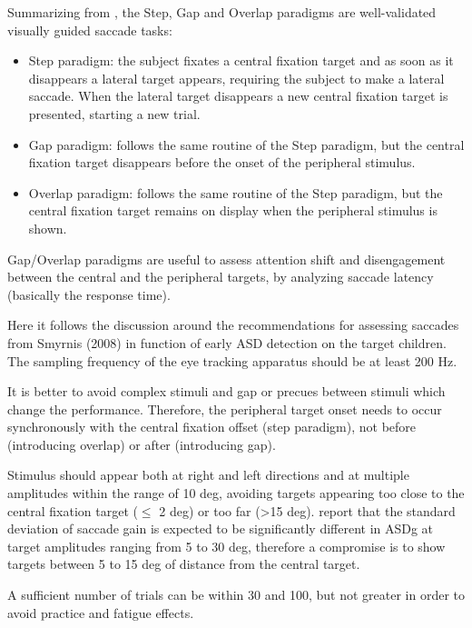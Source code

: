 Summarizing from \cite{zalla2016saccades}, the Step, Gap and Overlap paradigms are well-validated visually guided saccade tasks:
\begin{itemize}
    \item Step paradigm: the subject fixates a central fixation target and as soon as it disappears a lateral target appears, requiring the subject to make a lateral saccade. When the lateral target disappears a new central fixation target is presented, starting a new trial. 
    \item Gap paradigm: follows the same routine of the Step paradigm, but the central fixation target disappears before the onset of the peripheral stimulus.
    \item Overlap paradigm: follows the same routine of the Step paradigm, but the central fixation target remains on display when the peripheral stimulus is shown.
\end{itemize}

Gap/Overlap paradigms are useful to assess attention shift and disengagement between the central and the peripheral targets, by analyzing saccade latency (basically the response time). 

Here it follows the discussion around the recommendations for assessing saccades from Smyrnis (2008) in function of early ASD detection on the target children.
The sampling frequency of the eye tracking apparatus should be at least 200 Hz.

It is better to avoid complex stimuli and gap or precues between stimuli which change the performance. Therefore, the peripheral target onset needs to occur synchronously with the central fixation offset (step paradigm), not before (introducing overlap) or after (introducing gap).

Stimulus should appear both at right and left directions and at multiple amplitudes within the range of 10 deg, avoiding targets appearing too close to the central fixation target (\(\leq\) 2 deg) or too far (\textgreater 15 deg). \cite{johnson2016review} report that the standard deviation of saccade gain is expected to be significantly different in ASDg at target amplitudes ranging from 5 to 30 deg, therefore a compromise is to show targets between 5 to 15 deg of distance from the central target.

A sufficient number of trials can be within 30 and 100, but not greater in order to avoid practice and fatigue effects.
